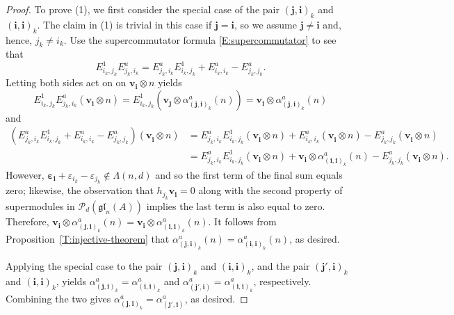 \documentclass[11pt,reqno]{amsart} %
\newcommand{\gl}{\mathfrak{gl}}
\newcommand{\0}{\bar{0}}
\newcommand{\1}{\bar{1}}
\newcommand{\bv}{\mathbf{v}}
\newcommand{\bi}{\mathbf{i}}
\newcommand{\bj}{\mathbf{j}}
\newcommand{\bepsilon}{\boldsymbol{\varepsilon}}
\newcommand{\Pol}{\mathcal{P}}
\numberwithin{equation}{subsection}
\begin{document}
\begin{proof}
To prove (1), we first consider the special case of the pair $(\bj, \bi)_{k}$ and $(\bi, \bi)_{k}$.  The claim in (1) is trivial in this case if $\bj = \bi$, so we assume $\bj  \neq \bi$ and, hence, $j_{k} \neq i_{k}$. Use the  supercommutator formula \eqref{E:supercommutator}  to see that
\[
E_{i_{k}, j_{k}}^{1}E_{j_{k}, i_{k}}^{a} = E_{j_{k},i_{k}}^{a}E_{i_{k},j_{k}}^{1} + E_{i_{k},i_{k}}^{a} - E^{a}_{j_{k}, j_{k}}.
\]
Letting both sides act on on $\bv^{}_{\bi} \otimes n$ yields 
\[
E_{i_{k}, j_{k}}^{1}E_{j_{k}, i_{k}}^{a}(\bv^{}_{\bi} \otimes n) = E_{i_{k}, j_{k}}^{1}(\bv^{}_{\bj} \otimes \alpha^{a}_{(\bj , \bi)_{k}}(n))= \bv^{}_{\bi} \otimes \alpha^{a}_{(\bj , \bi)_{k}}(n)
\] and 
\begin{align*}
\left(E_{j_{k},i_{k}}^{a}E_{i_{k},j_{k}}^{1} + E_{i_{k},i_{k}}^{a} - E^{a}_{j_{k}, j_{k}} \right)(\bv^{}_{\bi} \otimes n) &= E_{j_{k},i_{k}}^{a}E_{i_{k},j_{k}}^{1}(\bv^{}_{\bi} \otimes n) + E_{i_{k},i_{k}}^{a}(\bv^{}_{\bi} \otimes n) - E^{a}_{j_{k}, j_{k}}(\bv^{}_{\bi} \otimes n) \\
&= E_{j_{k},i_{k}}^{a}E_{i_{k},j_{k}}^{1}(\bv^{}_{\bi} \otimes n) + \bv^{}_{\bi} \otimes \alpha^{a}_{(\bi, \bi)_{k}}(n) - E^{a}_{j_{k}, j_{k}}(\bv^{}_{\bi} \otimes n).
\end{align*}
However, $\bepsilon_{\bi} + \varepsilon_{i_{k}}-\varepsilon_{j_{k}} \not \in \Lambda(n,d)$ and so the first term of the final sum equals zero; likewise, the observation that $h_{j_{k}}\bv_{\bi}=0$ along with the second property of supermodules in $\Pol_{d}(\gl_{n}(A))$ implies the last term is also equal to zero.  Therefore, $\bv^{}_{\bi} \otimes \alpha^{a}_{(\bj , \bi)_{k}}(n) = \bv^{}_{\bi} \otimes \alpha^{a}_{(\bi, \bi)_{k}}(n)$.  It follows from Proposition~\ref{T:injective-theorem} that $\alpha^{a}_{(\bj , \bi)_{k}}(n) = \alpha^{a}_{(\bi, \bi)_{k}}(n)$, as desired.

Applying the special case to the pair $(\bj , \bi )_{k}$ and $(\bi,\bi)_{k}$, and the pair $(\bj' , \bi )_{k}$ and $(\bi,\bi)_{k}$, yields $\alpha^{a}_{(\bj , \bi)_{k}} = \alpha^{a}_{(\bi,\bi)_{k}}$ and $ \alpha^{a}_{(\bj', \bi)}= \alpha^{a}_{(\bi,\bi)_{k}}$, respectively.  Combining the two gives  $\alpha^{a}_{(\bj , \bi)_{k}}  = \alpha^{a}_{(\bj', \bi)}$, as desired.



\end{proof}
\end{document}

